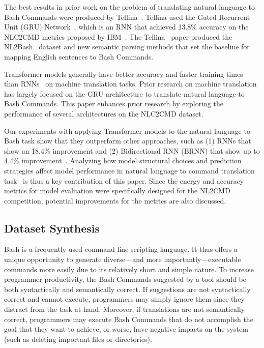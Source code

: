 \documentclass{river-journal}
\begin{document}
The best results in prior work on the problem of translating natural language to Bash Commands were produced by Tellina~\cite{Lin2017ProgramSF}.  Tellina used the Gated Recurrent Unit (GRU) Network~\cite{Chung2014EmpiricalEO},  which is an RNN that achieved 13.8\% accuracy on the NLC2CMD metrics proposed by IBM~\cite{Agarwal2021NeurIPS2N}. The Tellina~\cite{Lin2017ProgramSF} paper produced the NL2Bash~\cite{Lin2018NL2BashAC} dataset and new semantic parsing methods that set the baseline for mapping English sentences to Bash Commands.

Transformer models generally have better accuracy and faster training times~\cite{Caswell2020AdvIGTrans} than RNNs~\cite{Mikolov2010RecurrentNN} on machine translation tasks. Prior research on machine translation has largely focused on the GRU architecture to translate natural language to Bash Commands. This paper enhances prior research by exploring the performance of several architectures on the NLC2CMD dataset. 

Our experiments with applying Transformer models to the natural language to Bash task show that they outperform other approaches, such as (1) RNNs that show an 18.4\% improvement and (2) Bidirectional RNN (BRNN) that show up to 4.4\% improvement~\cite{Schuster1997BidirectionalRN}.
Analyzing how model structural choices and prediction strategies affect model performance in natural language to command translation task~\cite{Agarwal2021NeurIPS2N} is thus a key contribution of this paper. Since the energy and accuracy metrics for model evaluation were specifically designed for the NL2CMD competition, potential improvements for the metrics are also discussed.

\subsection{\bf Dataset Synthesis}
Bash is a frequently-used command line scripting language. It thus offers a unique opportunity to generate diverse---and more importantly---executable commands more easily due to its relatively short and simple nature. To increase programmer productivity, the Bash Commands suggested by a tool should be both syntactically and semantically correct. If suggestions are not syntactically correct and cannot execute, programmers may simply ignore them since they distract from the task at hand. Moreover, if translations are not semantically correct, programmers may execute Bash Commands that do not accomplish the goal that they want to achieve, or worse, have negative impacts on the system (such as deleting important files or directories). 
\end{document}
